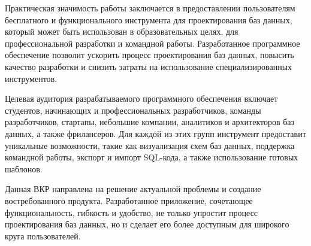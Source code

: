 Практическая значимость работы заключается в предоставлении пользователям бесплатного и функционального инструмента для проектирования баз данных, который может быть использован в образовательных целях, для профессиональной разработки и командной работы. Разработанное программное обеспечение позволит ускорить процесс проектирования баз данных, повысить качество разработки и снизить затраты на использование специализированных инструментов.

Целевая аудитория разрабатываемого программного обеспечения включает студентов, начинающих и профессиональных разработчиков, команды разработчиков, стартапы, небольшие компании, аналитиков и архитекторов баз данных, а также фрилансеров. Для каждой из этих групп инструмент предоставит уникальные возможности, такие как визуализация схем баз данных, поддержка командной работы, экспорт и импорт SQL-кода, а также использование готовых шаблонов.

Данная ВКР направлена на решение актуальной проблемы и создание
востребованного продукта. Разработанное приложение, сочетающее функциональность, гибкость и удобство, не только упростит процесс проектирования баз данных, но и сделает его более доступным для широкого круга пользователей.
